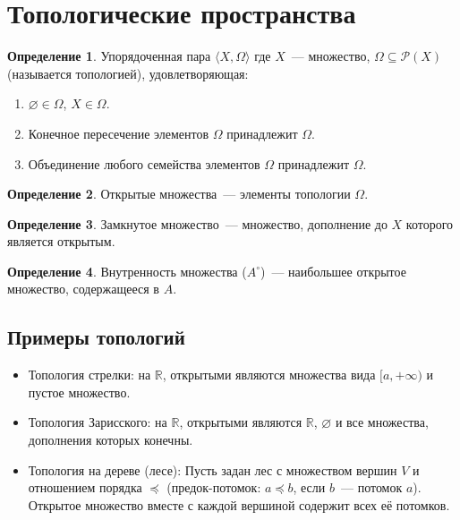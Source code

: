 \documentclass[a4paper,11pt]{article}
\theoremstyle{definition}
\newtheorem*{dfn}{Определение}
\begin{document}
\section{Топологические пространства}
\begin{dfn}
Упорядоченная пара $\langle X, \Omega\rangle$ где $X$~--- множество, $\Omega
\subseteq \mathcal{P}(X)$ (называется топологией), удовлетворяющая:
\begin{enumerate}
\item $\varnothing \in \Omega$, $X \in \Omega$.
\item Конечное пересечение элементов $\Omega$ принадлежит $\Omega$.
\item Объединение любого семейства элементов $\Omega$ принадлежит $\Omega$.
\end{enumerate}
\end{dfn}
\begin{dfn}
Открытые множества~--- элементы топологии $\Omega$.
\end{dfn}
\begin{dfn}
Замкнутое множество~--- множество, дополнение до $X$ которого является открытым.
\end{dfn}
\begin{dfn}
Внутренность множества ($A^\circ$)~--- наибольшее открытое множество,
содержащееся в $A$.
\end{dfn}

\subsection*{Примеры топологий}
\begin{itemize}
\item Топология стрелки: на $\mathbb{R}$, открытыми являются множества вида
  $[a, +\infty)$ и пустое множество.
\item Топология Зарисского: на $\mathbb{R}$, открытыми являются $\mathbb{R}$,
  $\varnothing$ и все множества, дополнения которых конечны.
\item Топология на дереве (лесе): Пусть задан лес с множеством вершин $V$ и
  отношением порядка $\preceq$ (предок-потомок: $a \preceq b$, если $b$~---
  потомок $a$). Открытое множество вместе с каждой вершиной содержит всех её
  потомков.
\end{itemize}
\end{document}

